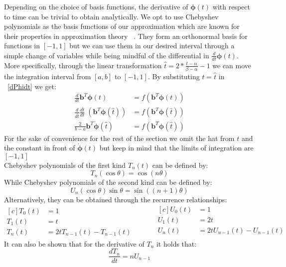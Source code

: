 \documentclass[11pt]{article}
\begin{document}
    Depending on the choice of basis functions, the derivative of $\pmb{\phi}(t)$ with respect to time can be trivial
    to obtain analytically.
    We opt to use Chebyshev polynomials as the basis functions of our approximation which are known for their
    properties in approximation theory ~\cite{trefethen1996finite}.
    They form an orthonormal basis for functions in $[-1,1]$ but we can use them in our desired interval through a
    simple change of variables while being mindful of the differential in $\frac{d}{dt} \pmb{\phi}(t) $.
    More specifically, through the linear transformation $\hat{t} = 2*\frac{ t -  \alpha} { \beta - \alpha} -1$ we can
    move the integration interval from $[a,b]$ to $[-1,1]$.
    By substituting $t = \hat{t}$  in ~\eqref{dPhidt} we get:
    \begin{align*}
        \frac{d}{dt}  \pmb{b}^T \pmb{\phi}(t) &= f( \pmb{b}^T \pmb{\phi}(t) ) \\
        \frac{d}{d\hat{t}} \frac{d \hat{t}}{dt} \; ( \pmb{b}^T \pmb{\phi}(\hat{t}) ) &= f( \pmb{b}^T \pmb{\phi}(\hat{t}) ) \\
        \frac{2}{b-a} \pmb{b}^T \pmb{\dot\phi}(\hat{t}) &= f( \pmb{b}^T \pmb{\phi}(\hat{t}) )
    \end{align*}
    For the sake of convenience for the rest of the section we omit the hat from $t$ and the constant in front of
    $\pmb{\dot\phi}(t)$ but keep in mind that the limits of integration are $[-1,1]$
    \\

    Chebyshev polynomials of the first kind $T_n(t)$ can be defined by:
    \begin{equation}
        T_n(\cos \theta) = \cos(n \theta)
    \end{equation}
    While Chebyshev polynomials of the second kind can be defined by:
    \begin{equation}
        U_n(\cos \theta) \sin \theta = \sin( (n+1)\theta )
    \end{equation}
    Alternatively, they can be obtained through the recurrence relationships:
    \begin{equation}
        \label{eq:cheb_rec}
        \begin{aligned}[c]
            T_0(t) &= 1 \\
            T_1(t) &= t \\
            T_n(t) &= 2tT_{n-1}(t) - T_{n-1}(t)
        \end{aligned}
        \qquad \quad
        \begin{aligned}[c]
            U_0(t) &= 1 \\
            U_1(t) &= 2t\\
            U_n(t) &= 2tU_{n-1}(t) - U_{n-1}(t)\\
        \end{aligned}
    \end{equation}
    It can also be shown that for the derivative of $T_n$ it holds that:
    \begin{equation}
        \frac{dT_n}{dt} = n U_{n-1}
        \label{Dcheb}
    \end{equation}
\end{document}
